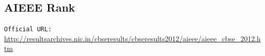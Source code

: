 \documentclass{article}
\begin{document}
	\subsection{AIEEE Rank}
		\texttt{Official URL:} \url{http://resultsarchives.nic.in/cbseresults/cbseresults2012/aieee/aieee_cbse_2012.htm}
		\begin{figure}[h]
		\end{figure}
		
\newpage
\end{document}
